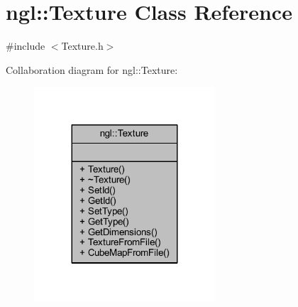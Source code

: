 \hypertarget{classngl_1_1_texture}{}\section{ngl\+:\+:Texture Class Reference}
\label{classngl_1_1_texture}


{\ttfamily \#include $<$Texture.\+h$>$}



Collaboration diagram for ngl\+:\+:Texture\+:
\nopagebreak
\begin{figure}[H]
\begin{center}
\leavevmode
\includegraphics[width=191pt]{classngl_1_1_texture__coll__graph}
\end{center}
\end{figure}

